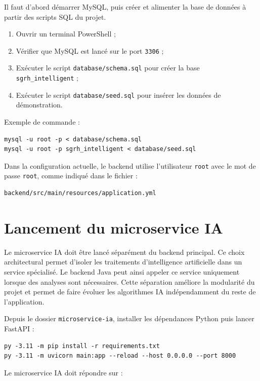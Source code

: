 \documentclass[12pt,a4paper]{report}
\begin{document}
Il faut d'abord démarrer MySQL, puis créer et alimenter la base de données à partir des scripts SQL du projet.

\begin{enumerate}
    \item Ouvrir un terminal PowerShell ;
    \item Vérifier que MySQL est lancé sur le port \texttt{3306} ;
    \item Exécuter le script \texttt{database/schema.sql} pour créer la base \texttt{sgrh\_intelligent} ;
    \item Exécuter le script \texttt{database/seed.sql} pour insérer les données de démonstration.
\end{enumerate}

Exemple de commande :

\begin{verbatim}
mysql -u root -p < database/schema.sql
mysql -u root -p sgrh_intelligent < database/seed.sql
\end{verbatim}

Dans la configuration actuelle, le backend utilise l'utilisateur \texttt{root} avec le mot de passe \texttt{root}, comme indiqué dans le fichier :

\begin{verbatim}
backend/src/main/resources/application.yml
\end{verbatim}

\section{Lancement du microservice IA}

Le microservice IA doit être lancé séparément du backend principal. Ce choix architectural permet d'isoler les traitements d'intelligence artificielle dans un service spécialisé. Le backend Java peut ainsi appeler ce service uniquement lorsque des analyses sont nécessaires. Cette séparation améliore la modularité du projet et permet de faire évoluer les algorithmes IA indépendamment du reste de l'application.

Depuis le dossier \texttt{microservice-ia}, installer les dépendances Python puis lancer FastAPI :

\begin{verbatim}
py -3.11 -m pip install -r requirements.txt
py -3.11 -m uvicorn main:app --reload --host 0.0.0.0 --port 8000
\end{verbatim}

Le microservice IA doit répondre sur :
\end{document}
